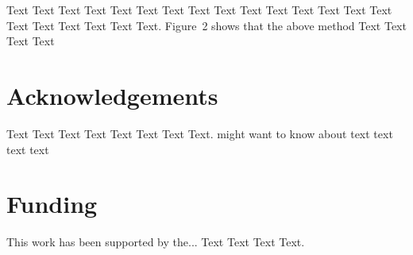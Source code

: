 \documentclass{bioinfo}
\begin{document}
Text Text Text Text Text Text  Text Text Text Text Text Text Text
Text Text  Text Text Text Text Text Text.
Figure~2\vphantom{\ref{fig:02}} shows that the above method  Text
Text Text Text\vspace*{-10pt}


\section*{Acknowledgements}

Text Text Text Text Text Text  Text Text.  \citealp{Boffelli03} might want to know about  text
text text text\vspace*{-12pt}

\section*{Funding}

This work has been supported by the... Text Text  Text Text.\vspace*{-12pt}

%
%
%
%
%
%
%
%
%
\end{document}
